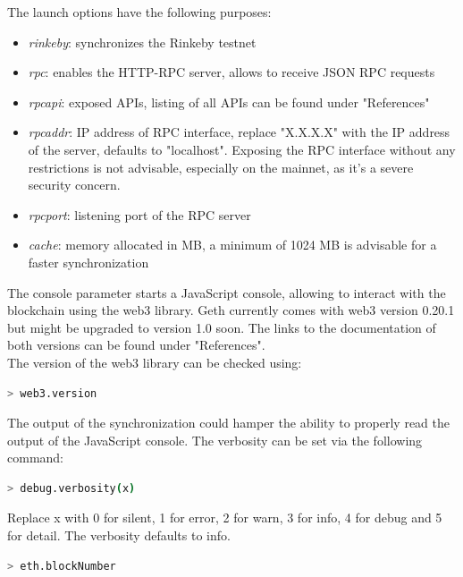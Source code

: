 The launch options have the following purposes\cite{cli-options}:
\begin{itemize}
    \item \textit{rinkeby}: synchronizes the Rinkeby testnet
    \item \textit{rpc}: enables the HTTP-RPC server, allows to receive JSON RPC requests
    \item \textit{rpcapi}: exposed APIs, listing of all APIs can be found under "References"\cite{json-rpc}\cite{management-apis}
    \item \textit{rpcaddr}: IP address of RPC interface, replace "X.X.X.X" with the IP address of the server, defaults to "localhost". Exposing the RPC interface without any restrictions is not advisable, especially on the mainnet, as it's a severe security concern.
    \item \textit{rpcport}: listening port of the RPC server
    \item \textit{cache}: memory allocated in MB, a minimum of 1024 MB is advisable for a faster synchronization
\end{itemize}
The console parameter starts a JavaScript console, allowing to interact with the blockchain using the web3 library. Geth currently comes with web3 version 0.20.1\cite{javascript-0.20} but might be upgraded to version 1.0\cite{javascript-1.0} soon. The links to the documentation of both versions can be found under "References".
\\
The version of the web3 library can be checked using:

\begin{lstlisting}[language=bash, numbers=none]
  > web3.version
\end{lstlisting}

The output of the synchronization could hamper the ability to properly read the output of the JavaScript console. The verbosity can be set via the following command:

\begin{lstlisting}[language=bash, numbers=none]
  > debug.verbosity(x)
\end{lstlisting}

Replace x with 0 for silent, 1 for error, 2 for warn, 3 for info, 4 for debug and 5 for detail. The verbosity defaults to info\cite{cli-options}.
\newpage

\begin{lstlisting}[language=bash, numbers=none]
  > eth.blockNumber
\end{lstlisting}

